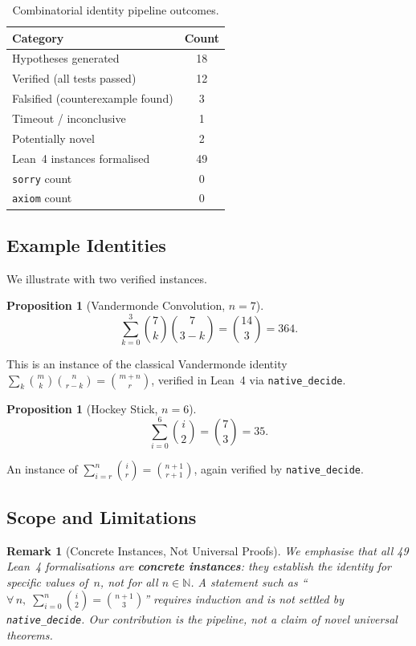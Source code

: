 \documentclass[11pt,a4paper]{article}
\newtheorem{proposition}[theorem]{Proposition}
\newtheorem{remark}[theorem]{Remark}
\begin{document}
\begin{table}[ht]
\centering
\caption{Combinatorial identity pipeline outcomes.}\label{tab:identities}
\begin{tabular}{@{}lc@{}}
\toprule
\textbf{Category} & \textbf{Count} \\
\midrule
Hypotheses generated          & 18 \\
Verified (all tests passed)   & 12 \\
Falsified (counterexample found) & 3 \\
Timeout / inconclusive        & 1 \\
Potentially novel              & 2 \\
\addlinespace
Lean~4 instances formalised    & 49 \\
\quad\texttt{sorry} count      & 0 \\
\quad\texttt{axiom} count      & 0 \\
\bottomrule
\end{tabular}
\end{table}

\subsection{Example Identities}

We illustrate with two verified instances.

\begin{proposition}[Vandermonde Convolution, $n=7$]\label{prop:vandermonde}
\[
  \sum_{k=0}^{3} \binom{7}{k}\binom{7}{3-k} = \binom{14}{3} = 364.
\]
\end{proposition}
\noindent This is an instance of the classical Vandermonde identity
$\sum_{k}\binom{m}{k}\binom{n}{r-k} = \binom{m+n}{r}$, verified in Lean~4
via \texttt{native\_decide}.

\begin{proposition}[Hockey Stick, $n=6$]\label{prop:hockey}
\[
  \sum_{i=0}^{6} \binom{i}{2} = \binom{7}{3} = 35.
\]
\end{proposition}
\noindent An instance of $\sum_{i=r}^{n}\binom{i}{r} = \binom{n+1}{r+1}$,
again verified by \texttt{native\_decide}.

\subsection{Scope and Limitations}

\begin{remark}[Concrete Instances, Not Universal Proofs]\label{rem:concrete}
We emphasise that all 49 Lean~4 formalisations are \textbf{concrete instances}:
they establish the identity for specific values of~$n$, not for all
$n \in \mathbb{N}$. A statement such as
``$\forall\, n,\; \sum_{i=0}^{n}\binom{i}{2} = \binom{n+1}{3}$'' requires
induction and is not settled by \texttt{native\_decide}. Our contribution is
the \emph{pipeline}, not a claim of novel universal theorems.
\end{remark}
\end{document}
